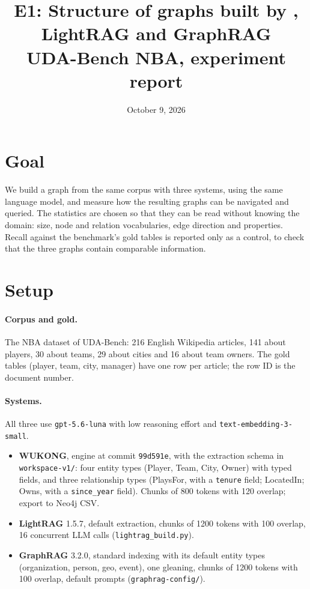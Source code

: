 \documentclass[11pt]{article}
\title{E1: Structure of graphs built by \wk, LightRAG and GraphRAG\\\large UDA-Bench NBA, experiment report}
\author{}
\date{October 9, 2026}
\newcommand{\code}[1]{\texttt{#1}}
\newcommand{\wk}{WUKONG}
\begin{document}
\maketitle

\section{Goal}

We build a graph from the same corpus with three systems, using the same language model, and
measure how the resulting graphs can be navigated and queried. The statistics are chosen so that
they can be read without knowing the domain: size, node and relation vocabularies, edge
direction and properties. Recall against the benchmark's gold tables is reported only as a
control, to check that the three graphs contain comparable information.

\section{Setup}

\paragraph{Corpus and gold.} The NBA dataset of UDA-Bench: 216 English Wikipedia articles,
141 about players, 30 about teams, 29 about cities and 16 about team owners. The gold tables
(player, team, city, manager) have one row per article; the row ID is the document number.

\paragraph{Systems.} All three use \code{gpt-5.6-luna} with low reasoning effort and
\code{text-embedding-3-small}.
\begin{itemize}
  \item \textbf{\wk}, engine at commit \code{99d591e}, with the extraction schema in \code{workspace-v1/}: four entity types
    (Player, Team, City, Owner) with typed fields, and three relationship types
    (PlaysFor, with a \code{tenure} field; LocatedIn; Owns, with a \code{since\_year} field).
    Chunks of 800 tokens with 120 overlap; export to Neo4j CSV.
  \item \textbf{LightRAG} 1.5.7, default extraction, chunks of 1200 tokens with 100 overlap,
    16 concurrent LLM calls (\code{lightrag\_build.py}).
  \item \textbf{GraphRAG} 3.2.0, standard indexing with its default entity types
    (organization, person, geo, event), one gleaning, chunks of 1200 tokens with 100 overlap,
    default prompts (\code{graphrag-config/}).
\end{itemize}
\end{document}
